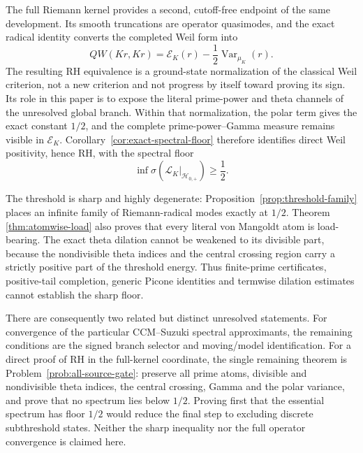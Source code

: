 \documentclass[11pt]{amsart}
\theoremstyle{definition}
\theoremstyle{remark}
\begin{document}
The full Riemann kernel provides a second, cutoff-free endpoint of the same
development.  Its smooth truncations are operator quasimodes, and the exact
radical identity converts the completed Weil form into
\[
 QW(Kr,Kr)
 =\mathscr E_K(r)-\frac12\operatorname{Var}_{\mu_K}(r).
\]
The resulting RH equivalence is a ground-state normalization of the
classical Weil criterion, not a new criterion and not progress by itself
toward proving its sign.  Its role in this paper is to expose the literal
prime-power and theta channels of the unresolved global branch.
Within that normalization, the polar term gives the exact constant
\(1/2\), and the complete
prime-power--Gamma measure remains visible in \(\mathscr E_K\).
Corollary~\ref{cor:exact-spectral-floor} therefore identifies direct Weil
positivity, hence RH, with the spectral floor
\[
 \inf\sigma(\mathcal L_K|_{\mathcal H_{0,+}})\ge\frac12.
\]

The threshold is sharp and highly degenerate:
Proposition~\ref{prop:threshold-family} places an infinite family of
Riemann-radical modes exactly at \(1/2\).  Theorem
\ref{thm:atomwise-load} also proves that every literal von Mangoldt atom is
load-bearing.  The exact theta dilation cannot be weakened to its divisible
part, because the nondivisible theta indices and the central crossing region
carry a strictly positive part of the threshold energy.  Thus finite-prime
certificates, positive-tail completion, generic Picone identities and
termwise dilation estimates cannot establish the sharp floor.

There are consequently two related but distinct unresolved statements.
For convergence of the particular CCM--Suzuki spectral approximants, the
remaining conditions are the signed branch selector and moving/model
identification.  For a direct proof of RH in the full-kernel coordinate, the
single remaining theorem is Problem~\ref{prob:all-source-gate}: preserve
all prime atoms, divisible and nondivisible theta indices, the central
crossing, Gamma and the polar variance, and prove that no spectrum lies
below \(1/2\).  Proving first that the essential spectrum has floor
\(1/2\) would reduce the final step to excluding discrete subthreshold
states.  Neither the sharp inequality nor the full operator convergence is
claimed here.
\end{document}

